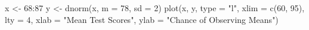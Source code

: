 \begin{Schunk}
\begin{Sinput}
 x <- 68:87
 y <- dnorm(x, m = 78, sd = 2)
 plot(x, y, type = "l", xlim = c(60, 95), lty = 4, xlab = "Mean Test Scores", 
      ylab = "Chance of Observing Means")
\end{Sinput}
\end{Schunk}
